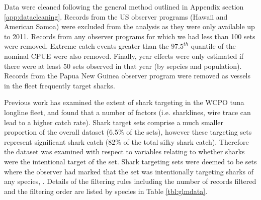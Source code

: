 Data were cleaned following the general method outlined in Appendix section \ref{app:datacleaning}. Records from the US observer programs (Hawaii and American Samoa) were excluded from the analysis as they were only available up to 2011. Records from any observer programs for which we had less than 100 sets were removed. Extreme catch events greater than the $97.5^{th}$ quantile of the nominal CPUE were also removed. Finally, year effects were only estimated if there were at least 50 sets observed in that year (by sepcies and population).  Records from the Papua New Guinea observer program were removed as vessels in the fleet frequently target sharks.
                                                                                      
Previous work \citep{Rice2012_a, Rice2013_a, Bromhead et al 1012} has examined the extent of shark targeting in the WCPO tuna longline fleet, and found that a number of factors (i.e. sharklines, wire trace can lead to a higher catch rate). Shark target sets comprise a much smaller proportion of the overall dataset (6.5\% of the sets), however these targeting sets represent significant shark catch (82\% of the total silky shark catch). Therefore the dataset was examined with respect to variables relating to whether sharks were the intentional target of the set.                                                                                      
Shark targeting sets were deemed to be sets where the observer had marked that the set was intentionally targeting sharks of any species, . %
Details of the  filtering rules including the number of records filtered and the filtering  order are listed by species in Table \ref{tbl:glmdata}. 
                                                                                       
